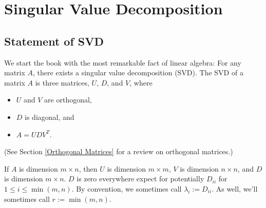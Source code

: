 \documentclass{amsbook}
\newtheorem{theorem}{Theorem}
\begin{document}
\begin{comment}
\section{Review (to be multiple sections)}

 \begin{theorem}
\label{cos_sim}
Given two vectors, $\vec u$, $\vec v$, with angle between them $\theta$, the inner product can be expressed as:
$$
\langle u|v\rangle = \|\vec u\|\cdot\|\vec v\|\cdot\cos\theta
$$
 \end{theorem}

 \begin{theorem}
\label{vector_decomp}
For any subspace $W$ and any vector $|v\rangle$, $|v\rangle$ can be written as $|v\rangle=|v_\parallel\rangle+|v_\bot\rangle$, where $|v_\parallel\rangle\in W$ and $\langle w|v_\bot\rangle=0$ for all $w\in W$.
 \end{theorem}
 \end{comment}

\chapter{Singular Value Decomposition}
\section{Statement of SVD}

We start the book with the most remarkable fact of linear algebra:  For any matrix $A$, there exists a singular value decomposition (SVD).  The SVD of a matrix $A$ is three matrices, $U$, $D$, and $V$, where

\begin{itemize}
	\item $U$ and $V$ are orthogonal,
	\item $D$ is diagonal, and
	\item $A=UDV^T$.
\end{itemize}

(See Section \ref{Orthogonal Matrices} for a review on orthogonal matrices.)

If $A$ is dimension $m\times n$, then $U$ is dimension $m\times m$, $V$ is dimension $n\times n$, and $D$ is dimension $m\times n$.  $D$ is zero everywhere expect for potentially $D_{ii}$ for $1\leq i\leq\min(m, n)$.  By convention, we sometimes call $\lambda_i:=D_{ii}$.  As well, we'll sometimes call $r:=\min(m, n)$.
\end{document}
